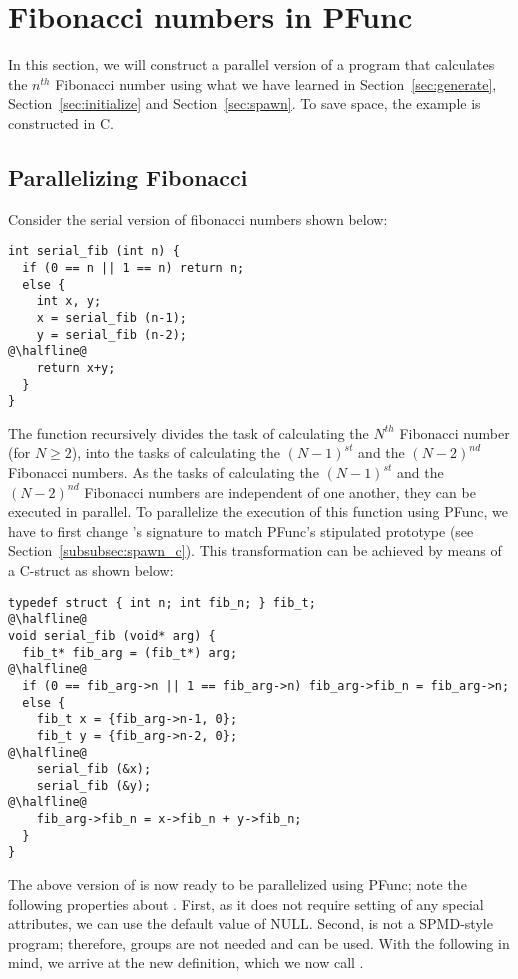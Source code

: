 \section{Fibonacci numbers in PFunc}
\label{sec:fibonacci}
%
In this section, we will construct a parallel version of a program that
calculates the $n^{th}$ Fibonacci number using what we have learned in
Section~\ref{sec:generate}, Section~\ref{sec:initialize} and
Section~\ref{sec:spawn}. To save space, the example is constructed in C.

\subsection{Parallelizing Fibonacci}
\label{subsec:fib_parallel}
%
Consider the serial version of fibonacci numbers shown below:
%
\begin{lstlisting}
int serial_fib (int n) {
  if (0 == n || 1 == n) return n;
  else {
    int x, y;
    x = serial_fib (n-1);
    y = serial_fib (n-2);
@\halfline@
    return x+y;
  }
}
\end{lstlisting}
%
The function  recursively divides the task of calculating the
$N^{th}$ Fibonacci number (for $N \ge 2$), into the tasks of calculating the
$(N-1)^{st}$ and the $(N-2)^{nd}$ Fibonacci numbers.  
%
As the tasks of calculating the $(N-1)^{st}$ and the $(N-2)^{nd}$ Fibonacci
numbers are independent of one another, they can be executed in parallel. 
%
To parallelize the execution of this function using PFunc, we have to first
change 's signature to match PFunc's stipulated  prototype (see Section~\ref{subsubsec:spawn_c}). 
%
This transformation can be achieved by means of a C-struct as shown below:
%
\begin{lstlisting}
typedef struct { int n; int fib_n; } fib_t;
@\halfline@
void serial_fib (void* arg) {
  fib_t* fib_arg = (fib_t*) arg;
@\halfline@
  if (0 == fib_arg->n || 1 == fib_arg->n) fib_arg->fib_n = fib_arg->n;
  else {
    fib_t x = {fib_arg->n-1, 0};
    fib_t y = {fib_arg->n-2, 0};
@\halfline@
    serial_fib (&x);
    serial_fib (&y);
@\halfline@
    fib_arg->fib_n = x->fib_n + y->fib_n;
  }
}
\end{lstlisting}
%
The above version of  is now ready to be parallelized using 
PFunc; note the following properties about . 
%
First, as it does not require setting of any special attributes, we can use the
default value of NULL. 
%
Second,  is not a SPMD-style program; therefore, groups are
not needed and  can be used. 
%
With the following in mind, we arrive at the new definition, which we now call
.

